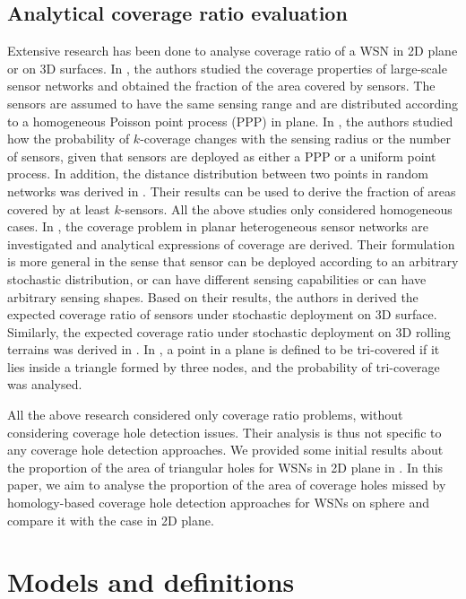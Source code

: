 \documentclass[journal, twoside]{IEEEtran}
\begin{document}
\subsection{Analytical coverage ratio evaluation} 

Extensive research has been done to analyse coverage ratio of a WSN in 2D plane or on 3D surfaces. 
In \cite{LT04}, the authors studied the coverage properties of large-scale
sensor networks and obtained the fraction of the area covered by sensors. 
The sensors are assumed to have the same sensing range and 
are distributed according to a homogeneous Poisson point process (PPP) in plane.
In \cite{WY06}, the authors studied how the 
probability of $k$-coverage changes with the sensing radius 
or the number of sensors, given that sensors are deployed
as either a PPP or a uniform point process. 
In addition, the distance distribution between two points
in random networks was derived in \cite{M12}. Their results can be 
used to derive the fraction of areas covered by at least $k$-sensors.
All the above studies only considered homogeneous cases. 
In \cite{LP06}, the coverage problem in planar heterogeneous sensor 
networks are investigated and analytical expressions of coverage
are derived. Their formulation is more general in the sense that
sensor can be deployed according to an arbitrary stochastic distribution,
or can have different sensing capabilities or can have arbitrary
sensing shapes. Based on their results, the authors in \cite{ZLW09}
derived the expected coverage ratio of sensors under stochastic 
deployment on 3D surface. Similarly, the expected coverage ratio 
under stochastic deployment on 3D rolling terrains was derived in 
\cite{LM12}. In \cite{LHZ12}, a point in a plane
is defined to be tri-covered if it lies inside a triangle formed
by three nodes, and the probability of tri-coverage was analysed.

All the above research considered only coverage ratio
problems, without considering coverage hole detection issues. 
Their analysis is thus not specific to any coverage hole detection
approaches. We provided some initial 
results about the proportion of the area of triangular holes for 
WSNs in 2D plane in \cite{YMD12}. In this paper, we aim to analyse the proportion of 
the area of coverage holes missed by homology-based coverage hole 
detection approaches for WSNs on sphere and compare it with the case
in 2D plane. 

\section{Models and definitions} \label{secmod}
\end{document}
